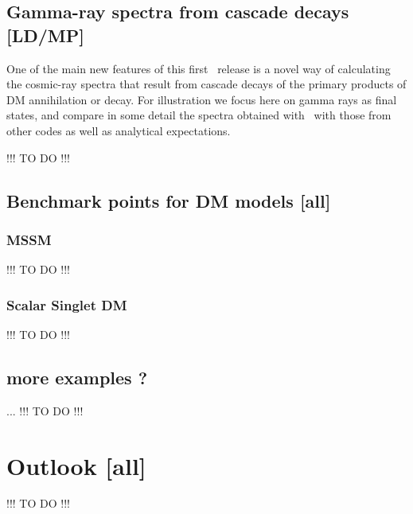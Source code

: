 \subsection{Gamma-ray spectra from cascade decays {\bf [LD/MP]}}

One of the main new features of this first \DB\ release is a novel way of calculating the cosmic-ray spectra that result from 
cascade decays of the primary products of DM annihilation or decay. For illustration we focus here on gamma
rays as final states, and compare in some detail the spectra obtained with \DB\ with those from other codes
as well as analytical expectations.

\smallskip
{\color{red} !!! TO DO !!!}
\smallskip



\subsection{Benchmark points for DM models {\bf [all]}}

\subsubsection{MSSM}
\smallskip
{\color{red} !!! TO DO !!!}
\smallskip


\subsubsection{Scalar Singlet DM}
\smallskip
{\color{red} !!! TO DO !!!}
\smallskip


\subsection{more examples ?}
...
\smallskip
{\color{red} !!! TO DO !!!}
\smallskip



\section{Outlook {\bf [all]}}
\label{out}
\smallskip
{\color{red} !!! TO DO !!!}
\smallskip



